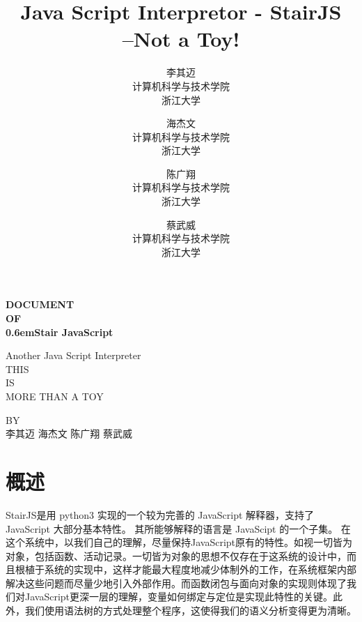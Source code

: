 \documentclass[a4paper]{article}
\title{
    Java Script Interpretor - StairJS\\
    \small{--Not a Toy!}
}
\author{
    李其迈\\
    计算机科学与技术学院\\
    浙江大学\\
    \and 
    海杰文\\
    计算机科学与技术学院\\
    浙江大学\\
    \and 
    陈广翔\\
    计算机科学与技术学院\\
    浙江大学\\
    \and 
    蔡武威\\
    计算机科学与技术学院\\
    浙江大学\\
}
\begin{document}
\begin{CJK}{UTF8}{gbsn}
\begin{titlepage}
    \clearpage
    \newcommand\nbvspace[1][3]{\vspace*{\stretch{#1}}}
    \newcommand\nbstretchyspace{\spaceskip0.5em plus 0.25em minus 0.25em}
    \newcommand{\nbtitlestretch}{\spaceskip0.6em}
    \pagestyle{empty}
    \begin{center}
        \bfseries
        \nbvspace[3]
        \normalsize
        DOCUMENT\\
        OF\\
        \Huge
        {\nbtitlestretch\huge Stair JavaScript}

        \normalsize

        Another Java Script Interpreter\\
        \nbvspace[1]
        \small 
        THIS\\
        IS\\
        MORE THAN A TOY\\[0.5em]

        \nbvspace[2]

        \nbvspace[3]
        \normalsize

        BY\\
        \large
        李其迈 海杰文 陈广翔 蔡武威
        \nbvspace[1]
    \end{center}
\end{titlepage}

\newpage

\tableofcontents
\newpage
\section{概述}
    StairJS是用 python3 实现的一个较为完善的 JavaScript 解释器，支持了 JavaScript 大部分基本特性。 其所能够解释的语言是 JavaScipt 的一个子集。 在这个系统中，以我们自己的理解，尽量保持JavaScript原有的特性。如视一切皆为对象，包括函数、活动记录。一切皆为对象的思想不仅存在于这系统的设计中，而且根植于系统的实现中，这样才能最大程度地减少体制外的工作，在系统框架内部解决这些问题而尽量少地引入外部作用。而函数闭包与面向对象的实现则体现了我们对JavaScript更深一层的理解，变量如何绑定与定位是实现此特性的关键。此外，我们使用语法树的方式处理整个程序，这使得我们的语义分析变得更为清晰。


\end{CJK}
\end{document}
